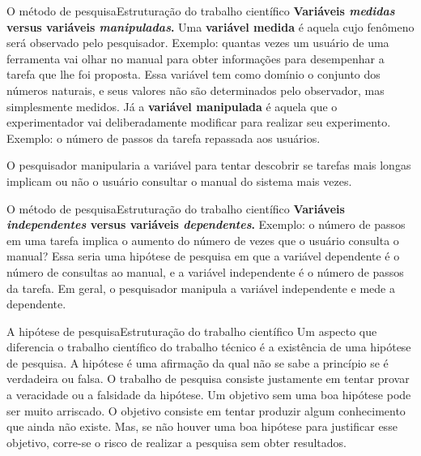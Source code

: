 \documentclass[t]{beamer}
\begin{document}

\begin{ftst}{O método de pesquisa}{Estruturação do trabalho científico}
\justifying
\textbf{Variáveis \textit{medidas} versus variáveis \textit{manipuladas}.}
\vone
Uma \textbf{variável medida} é aquela cujo fenômeno será observado pelo pesquisador. Exemplo: quantas vezes um usuário de uma ferramenta vai olhar no manual para obter informações para desempenhar a tarefa que lhe foi proposta. Essa variável tem como domínio o conjunto dos números naturais, e seus valores não são determinados pelo observador, mas simplesmente medidos.
\vone
Já a \textbf{variável manipulada} é aquela que o experimentador vai deliberadamente modificar para realizar seu experimento. Exemplo: o número de passos da tarefa repassada aos usuários.

\vone
O pesquisador manipularia a variável para tentar descobrir se tarefas mais longas implicam ou não o usuário consultar o manual do sistema mais vezes.


\end{ftst}


\begin{ftst}{O método de pesquisa}{Estruturação do trabalho científico}
\justifying
\textbf{Variáveis \textit{independentes} versus variáveis \textit{dependentes}.}
\vone
Exemplo: o número de passos em uma tarefa implica o aumento do número de vezes que o usuário consulta o manual?
\vone
Essa seria uma hipótese de pesquisa em que a variável dependente é o número de consultas ao manual, e a variável independente é o número de passos da tarefa.
\vone
Em geral, o pesquisador manipula a variável independente e mede a dependente. 

\end{ftst}


\begin{ftst}{A hipótese de pesquisa}{Estruturação do trabalho científico}
\justifying
Um aspecto que diferencia o trabalho científico do trabalho técnico é a existência de uma hipótese de pesquisa. 
\vone
A hipótese é uma afirmação da qual não se sabe a princípio se é verdadeira ou falsa. O trabalho de pesquisa consiste justamente em tentar provar a veracidade ou a falsidade da hipótese.
\vone
Um objetivo sem uma boa hipótese pode ser muito arriscado. O objetivo consiste em tentar produzir algum conhecimento que ainda não existe. Mas, se não houver uma boa hipótese para justificar esse objetivo, corre-se o risco de realizar a pesquisa sem obter resultados.  

\end{ftst}

\end{document}
